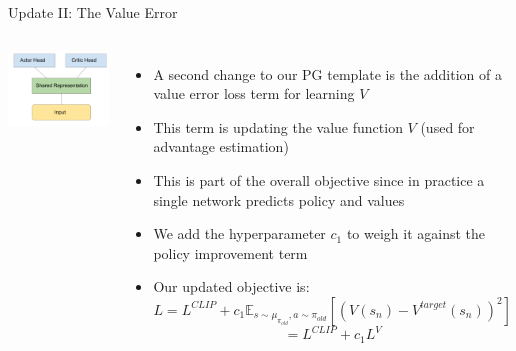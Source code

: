 \documentclass[aspectratio=169]{../latex_main/tntbeamer}  %
\begin{document}
\begin{frame}[c]{Update II: The Value Error}

\begin{columns}


\centering
        \includegraphics[scale=0.2]{w07_2_policy_gradient_methods/images/ac-arch.pdf}


\begin{itemize}
	    \item A second change to our PG template is the addition of a value error loss term for learning $V$
        \item This term is updating the value function $V$ (used for advantage estimation)
        \item This is part of the overall objective since in practice a single network predicts policy and values
        \item We add the hyperparameter $c_1$ to weigh it against the policy improvement term
        \item Our updated objective is:
        $$L = L^{CLIP} + c_1  \mathbb{E}_{s\sim \mu_{\pi_{old}}, a \sim \pi_{old}} \left[ (V(s_n) - V^{target}(s_n))^2 \right] $$
        $$= L^{CLIP} + c_1 L^V$$
	\end{itemize}

\end{columns}

        
	



\end{frame}
\end{document}

